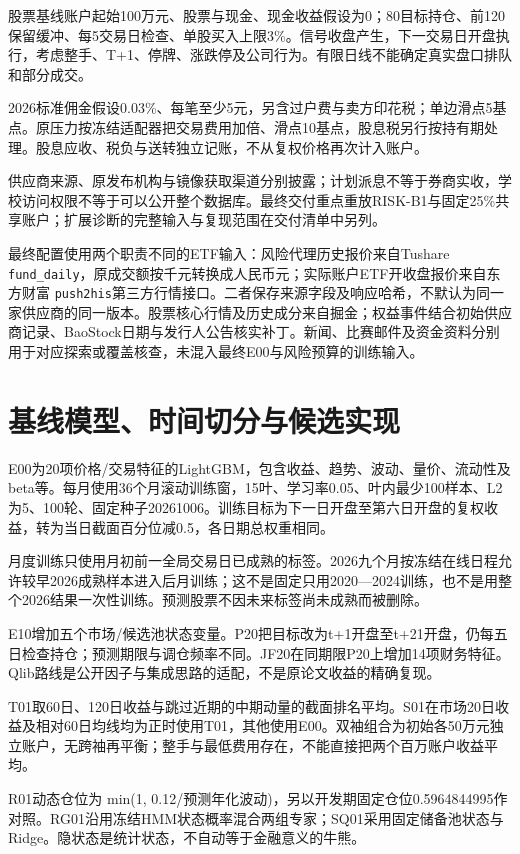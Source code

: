 \documentclass[12pt]{article}
\begin{document}
股票基线账户起始100万元、股票与现金、现金收益假设为0；80目标持仓、前120保留缓冲、每5交易日检查、单股买入上限3\%。信号收盘产生，下一交易日开盘执行，考虑整手、T+1、停牌、涨跌停及公司行为。有限日线不能确定真实盘口排队和部分成交。

2026标准佣金假设0.03\%、每笔至少5元，另含过户费与卖方印花税；单边滑点5基点。原压力按冻结适配器把交易费用加倍、滑点10基点，股息税另行按持有期处理。股息应收、税负与送转独立记账，不从复权价格再次计入账户。

供应商来源、原发布机构与镜像获取渠道分别披露；计划派息不等于券商实收，学校访问权限不等于可以公开整个数据库。最终交付重点重放RISK-B1与固定25\%共享账户；扩展诊断的完整输入与复现范围在交付清单中另列。


最终配置使用两个职责不同的ETF输入：风险代理历史报价来自Tushare \texttt{fund\_daily}，原成交额按千元转换成人民币元；实际账户ETF开收盘报价来自东方财富 \texttt{push2his}第三方行情接口。二者保存来源字段及响应哈希，不默认为同一家供应商的同一版本。股票核心行情及历史成分来自掘金；权益事件结合初始供应商记录、BaoStock日期与发行人公告核实补丁。新闻、比赛邮件及资金资料分别用于对应探索或覆盖核查，未混入最终E00与风险预算的训练输入。

\section{基线模型、时间切分与候选实现}
E00为20项价格/交易特征的LightGBM，包含收益、趋势、波动、量价、流动性及beta等。每月使用36个月滚动训练窗，15叶、学习率0.05、叶内最少100样本、L2为5、100轮、固定种子20261006。训练目标为下一日开盘至第六日开盘的复权收益，转为当日截面百分位减0.5，各日期总权重相同。

月度训练只使用月初前一全局交易日已成熟的标签。2026九个月按冻结在线日程允许较早2026成熟样本进入后月训练；这不是固定只用2020—2024训练，也不是用整个2026结果一次性训练。预测股票不因未来标签尚未成熟而被删除。

E10增加五个市场/候选池状态变量。P20把目标改为t+1开盘至t+21开盘，仍每五日检查持仓；预测期限与调仓频率不同。JF20在同期限P20上增加14项财务特征。Qlib路线是公开因子与集成思路的适配，不是原论文收益的精确复现\cite{ref2}。

T01取60日、120日收益与跳过近期的中期动量的截面排名平均。S01在市场20日收益及相对60日均线均为正时使用T01，其他使用E00。双袖组合为初始各50万元独立账户，无跨袖再平衡；整手与最低费用存在，不能直接把两个百万账户收益平均。

R01动态仓位为 min(1, 0.12/预测年化波动)，另以开发期固定仓位0.5964844995作对照。RG01沿用冻结HMM状态概率混合两组专家；SQ01采用固定储备池状态与Ridge。隐状态是统计状态，不自动等于金融意义的牛熊\cite{ref3}。
\end{document}
